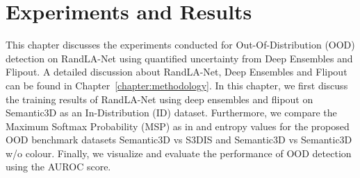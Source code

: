 

    \chapter{Experiments and Results}
    This chapter discusses the experiments conducted for Out-Of-Distribution (OOD) detection on RandLA-Net using quantified uncertainty from Deep Ensembles and Flipout.
    A detailed discussion about RandLA-Net, Deep Ensembles and Flipout can be found in Chapter~\ref{chapter:methodology}. In this chapter, we first discuss the training results of RandLA-Net using deep ensembles and flipout on Semantic3D as an In-Distribution (ID) dataset.
    Furthermore, we compare the Maximum Softmax Probability (MSP) as in \cite{hendrycks2016baseline_MSP} and entropy values for the proposed OOD benchmark datasets Semantic3D vs S3DIS and Semantic3D vs Semantic3D w/o colour.
    Finally, we visualize and evaluate the performance of OOD detection using the AUROC score.

